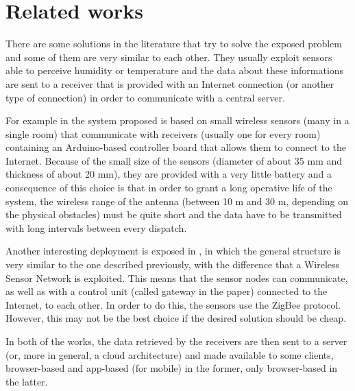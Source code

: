 \section{Related works}
\label{sec:related_works}


There are some solutions in the literature that try to solve the exposed problem
and some of them are very similar to each other. They usually exploit sensors
able to perceive humidity or temperature and the data about these informations
are sent to a receiver that is provided with an Internet connection (or another
type of connection) in order to communicate with a central server.

For example in \cite{7969984} the system proposed is based on small wireless
sensors (many in a single room) that communicate with receivers (usually one for
every room) containing an Arduino-based controller board that allows them to
connect to the Internet. Because of the small size of the sensors (diameter of
about 35 mm and thickness of about 20 mm), they are provided with a very little
battery and a consequence of this choice is that in order to grant a long
operative life of the system, the wireless range of the antenna (between 10 m
and 30 m, depending on the physical obstacles) must be quite short and the data
have to be transmitted with long intervals between every dispatch.

Another interesting deployment is exposed in \cite{6348392}, in which the
general structure is very similar to the one described previously, with the
difference that a Wireless Sensor Network is exploited. This means that the
sensor nodes can communicate, as well as with a control unit (called gateway in
the paper) connected to the Internet, to each other. In order to do this, the
sensors use the ZigBee protocol. However, this may not be the best choice if the
desired solution should be cheap.

In both of the works, the data retrieved by the receivers are then sent to a
server (or, more in general, a cloud architecture) and made available to some
clients, browser-based and app-based (for mobile) in the former, only
browser-based in the latter.
